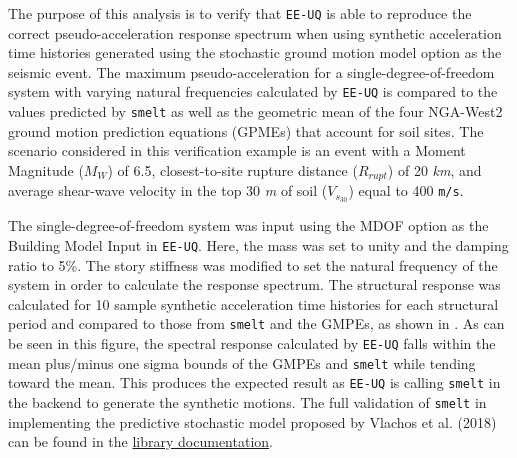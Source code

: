The purpose of this analysis is to verify that \texttt{EE-UQ} is able
to reproduce the correct pseudo-acceleration response spectrum when
using synthetic acceleration time histories generated using the
stochastic ground motion model option as the seismic event. The maximum
pseudo-acceleration for a single-degree-of-freedom system with varying
natural frequencies calculated by \texttt{EE-UQ} is compared to the
values predicted by \texttt{smelt} as well as the geometric mean
of the four NGA-West2 ground motion prediction equations (GPMEs)
that account for soil sites. The scenario considered in this verification
example is an event with a Moment Magnitude ($M_W$) of 6.5, closest-to-site
rupture distance ($R_{rupt}$) of 20 \textit{km}, and average shear-wave velocity in the top
30 \textit{m} of soil ($V_{s_{30}}$) equal to 400 \texttt{m/s}.

The single-degree-of-freedom system was input using the MDOF option as
the Building Model Input in \texttt{EE-UQ}. Here, the mass was set to
unity and the damping ratio to 5\%. The story stiffness was modified
to set the natural frequency of the system in order to calculate the
response spectrum. The structural response was calculated for 10
sample synthetic acceleration time histories for each structural
period and compared to those from \texttt{smelt} and the GMPEs, as
shown in . As can be seen in this
figure, the spectral response calculated by \texttt{EE-UQ} falls
within the mean plus/minus one sigma bounds of the GMPEs and
\texttt{smelt} while tending toward the mean. This produces the
expected result as \texttt{EE-UQ} is calling \texttt{smelt} in the
backend to generate the synthetic motions. The full validation of
\texttt{smelt} in implementing the predictive stochastic model
proposed by Vlachos et al. (2018) \cite{vlachos2018predictive} can be
found in the
\href{https://github.com/shellshocked2003/Stochastic-Loading-Module/blob/master/README.md}{library
  documentation}.

